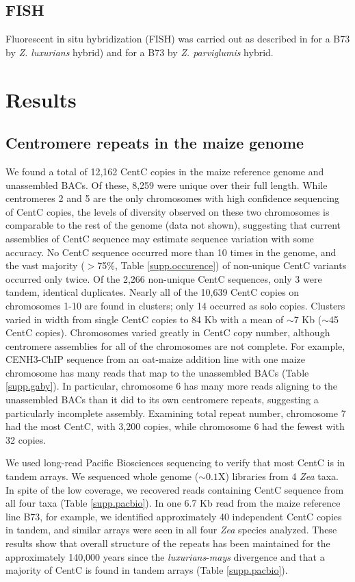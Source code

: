 \subsection*{FISH}

Fluorescent in situ hybridization (FISH) was carried out as described in \citet{kato2004paint} for a B73 by \emph{Z. luxurians} hybrid) and \citet{Shi2010} for a B73 by \emph{Z. parviglumis} hybrid. 

\section*{Results}
\label{results}

\subsection*{Centromere repeats in the maize genome}

We found a total of 12,162 CentC copies in the maize reference genome and unassembled BACs.  
Of these, 8,259 were unique over their full length.
While centromeres 2 and 5 are the only chromosomes with high confidence sequencing of CentC copies, the levels of diversity observed on these two chromosomes is comparable to the rest of the genome (data not shown), suggesting that current assemblies of CentC sequence may estimate sequence variation with some accuracy.
No CentC sequence occurred more than 10 times in the genome, and the vast majority ($>$75\%, Table \ref{supp.occurence}) of non-unique CentC variants occurred only twice.  
Of the 2,266 non-unique CentC sequences, only 3 were tandem, identical duplicates.  
Nearly all of the 10,639 CentC copies on chromosomes 1-10 are found in clusters; only 14 occurred as solo copies.  
Clusters varied in width from single CentC copies to 84 Kb with a mean of $\sim$7 Kb ($\sim$45 CentC copies). 
Chromosomes varied greatly in CentC copy number, although centromere assemblies for all of the chromosomes are not complete.   
For example, CENH3-ChIP sequence from an oat-maize addition line with one maize chromosome \citep{kynast2001} has many reads that map to the unassembled BACs (Table \ref{supp.gaby}).  
In particular, chromosome 6 has many more reads aligning to the unassembled BACs than it did to its own centromere repeats, suggesting a particularly incomplete assembly.  
Examining total repeat number, chromosome 7 had the most CentC, with 3,200 copies, while chromosome 6 had the fewest with 32 copies.

We used long-read Pacific Biosciences sequencing to verify that most CentC is in tandem arrays. 
We sequenced whole genome ($\sim 0.1$X) libraries from 4 \emph{Zea} taxa.  
In spite of the low coverage, we recovered reads containing CentC sequence from all four taxa (Table \ref{supp.pacbio}).  
In one 6.7 Kb read from the maize reference line B73, for example, we identified approximately 40 independent CentC copies in tandem, and similar arrays were seen in all four \emph{Zea} species analyzed.  
These results show that overall structure of the repeats has been maintained for the approximately 140,000 years since the \emph{luxurians}-\emph{mays} divergence \citep{Hanson1996,  Ross-Ibarra2009} and that a majority of CentC is found in tandem arrays (Table \ref{supp.pacbio}).

